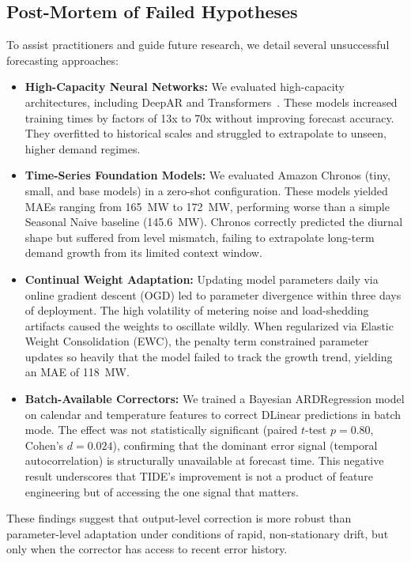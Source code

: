 \documentclass[11pt,letterpaper]{article}
\begin{document}
\subsection{Post-Mortem of Failed Hypotheses}
To assist practitioners and guide future research, we detail several unsuccessful forecasting approaches:
\begin{itemize}
    \item \textbf{High-Capacity Neural Networks:} We evaluated high-capacity architectures, including DeepAR and Transformers~\cite{zhou2021informer}. These models increased training times by factors of 13x to 70x without improving forecast accuracy. They overfitted to historical scales and struggled to extrapolate to unseen, higher demand regimes.
    \item \textbf{Time-Series Foundation Models:} We evaluated Amazon Chronos (tiny, small, and base models) in a zero-shot configuration. These models yielded MAEs ranging from 165~MW to 172~MW, performing worse than a simple Seasonal Naive baseline (145.6~MW). Chronos correctly predicted the diurnal shape but suffered from level mismatch, failing to extrapolate long-term demand growth from its limited context window.
    \item \textbf{Continual Weight Adaptation:} Updating model parameters daily via online gradient descent (OGD) led to parameter divergence within three days of deployment. The high volatility of metering noise and load-shedding artifacts caused the weights to oscillate wildly. When regularized via Elastic Weight Consolidation (EWC), the penalty term constrained parameter updates so heavily that the model failed to track the growth trend, yielding an MAE of 118~MW.
    \item \textbf{Batch-Available Correctors:} We trained a Bayesian ARDRegression model on calendar and temperature features to correct DLinear predictions in batch mode. The effect was not statistically significant (paired $t$-test $p = 0.80$, Cohen's $d = 0.024$), confirming that the dominant error signal (temporal autocorrelation) is structurally unavailable at forecast time. This negative result underscores that TIDE's improvement is not a product of feature engineering but of accessing the one signal that matters.
\end{itemize}

These findings suggest that output-level correction is more robust than parameter-level adaptation under conditions of rapid, non-stationary drift, but only when the corrector has access to recent error history.
\end{document}
